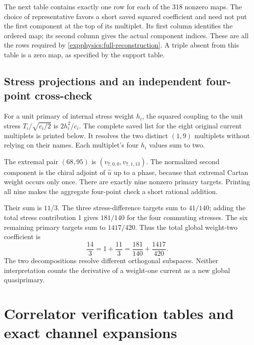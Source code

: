 

The next table contains exactly one row for each of the 318 nonzero
maps. The choice of representative favors a short saved squared
coefficient and need not put the first component at the top of its
multiplet. Its first column identifies the ordered map; its second
column gives the actual component indices. These are all the rows
required by \eqref{expphysics:full-reconstruction}. A triple absent
from this table is a zero map, as specified by the support table.



\subsection{Stress projections and an independent four-point cross-check}

For a unit primary of internal stress weight $h_i$, the squared
coupling to the unit stress $T_i/\sqrt{c_i/2}$ is $2h_i^2/c_i$.
The complete saved list for the eight original current multiplets
is printed below. It resolves the two distinct $(1,9)$ multiplets
without relying on their names. Each multiplet's four $h_i$ values
sum to two.



The extremal pair $(68,95)$ is
$(v_{7,0,0},v_{7,1,13})$. The normalized second component is the
chiral adjoint of $\widehat u$ up to a phase, because that extremal
Cartan weight occurs only once. There are exactly nine nonzero
primary targets. Printing all nine makes the aggregate
four-point check a short rational addition.



Their sum is $11/3$. The three stress-difference targets sum to
$41/140$; adding the total stress contribution 1 gives $181/140$
for the four commuting stresses. The six remaining primary targets
sum to $1417/420$. Thus the total global weight-two coefficient is
\[
 \frac{14}{3}
 =1+\frac{11}{3}
 =\frac{181}{140}+\frac{1417}{420}.
\]
The two decompositions resolve different orthogonal subspaces.
Neither interpretation counts the derivative of a weight-one
current as a new global quasiprimary.

\clearpage
\section{Correlator verification tables and exact channel expansions}
\label{expphysics:correlator-details}


